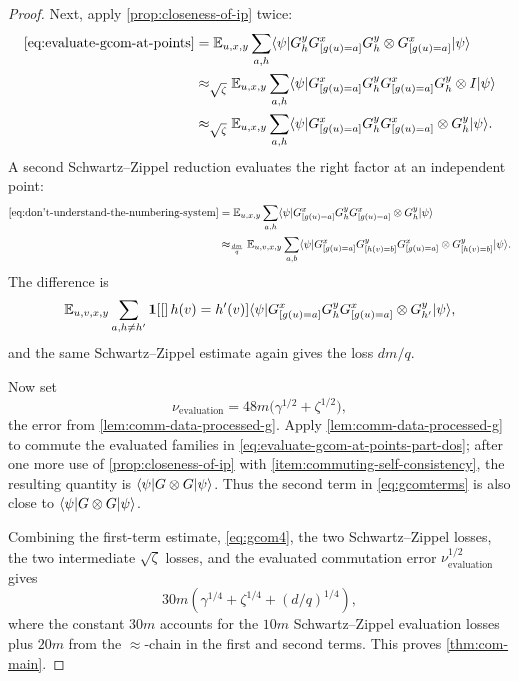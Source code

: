 \begin{proof}
	Next, apply \ref{prop:closeness-of-ip} twice:
	\begin{align}
		\eqref{eq:evaluate-gcom-at-points}
		 & = \mathbb{E}_{u,x,y} \sum_{a,h}
		\langle \psi \rvert G_h^y G^x_{[g(u)=a]} G_h^y \otimes G^x_{[g(u)=a]} \lvert \psi \rangle\nonumber   \\
		 & \approx_{\sqrt{\zeta}}
		\mathbb{E}_{u,x,y} \sum_{a,h}
		\langle \psi \rvert G^x_{[g(u)=a]} G_h^y G^x_{[g(u)=a]} G_h^y \otimes I \lvert \psi \rangle\nonumber \\
		 & \approx_{\sqrt{\zeta}}
		\mathbb{E}_{u,x,y} \sum_{a,h}
		\langle \psi \rvert G^x_{[g(u)=a]} G_h^y G^x_{[g(u)=a]} \otimes G_h^y \lvert \psi \rangle.
		\label{eq:don't-understand-the-numbering-system}
	\end{align}
	A second Schwartz--Zippel reduction evaluates the right factor at an independent point:
	\begin{align}
		\eqref{eq:don't-understand-the-numbering-system}
		 & = \mathbb{E}_{u,x,y} \sum_{a,h}
		\langle \psi \rvert G^x_{[g(u)=a]} G_h^y G^x_{[g(u)=a]} \otimes G_h^y \lvert \psi \rangle\nonumber \\
		 & \approx_{\frac{dm}{q}}
		\mathbb{E}_{u,v,x,y} \sum_{a,b}
		\langle \psi \rvert
		G^x_{[g(u)=a]} G^y_{[h(v)=b]} G^x_{[g(u)=a]}
		\otimes G^y_{[h(v)=b]} \lvert \psi \rangle.
		\label{eq:evaluate-gcom-at-points-part-dos}
	\end{align}
	The difference is
	\begin{equation}
		\label{eq:numbering-system-diff}
		\mathbb{E}_{u,v,x,y} \sum_{a,h \neq h'}
		\mathbf{1}\!\left[[\right]h(v)=h'(v)]
		\langle \psi \rvert
		G^x_{[g(u)=a]} G_h^y G^x_{[g(u)=a]} \otimes G_{h'}^y \lvert \psi \rangle,
	\end{equation}
	and the same Schwartz--Zippel estimate again gives the loss $dm/q$.

	Now set
	\[
		\nu_{\mathrm{evaluation}} = 48m\bigl(\gamma^{1/2}+\zeta^{1/2}\bigr),
	\]
	the error from \ref{lem:comm-data-processed-g}. Apply \ref{lem:comm-data-processed-g} to commute the evaluated families in \ref{eq:evaluate-gcom-at-points-part-dos}; after one more use of \ref{prop:closeness-of-ip} with \ref{item:commuting-self-consistency}, the resulting quantity is $\langle \psi \rvert G \otimes G \lvert \psi \rangle$. Thus the second term in \ref{eq:gcomterms} is also close to $\langle \psi \rvert G \otimes G \lvert \psi \rangle$.

	Combining the first-term estimate, \ref{eq:gcom4}, the two Schwartz--Zippel losses, the two intermediate $\sqrt{\zeta}$ losses, and the evaluated commutation error $\nu_{\mathrm{evaluation}}^{1/2}$ gives
	\[
		30m\left(\gamma^{1/4}+\zeta^{1/4}+(d/q)^{1/4}\right),
	\]
	where the constant $30m$ accounts for the $10m$ Schwartz--Zippel evaluation losses plus $20m$ from the $\approx$-chain in the first and second terms. This proves \ref{thm:com-main}.
\end{proof}
